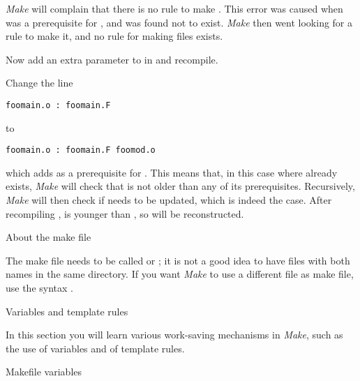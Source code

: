   {\emph{Make} will complain that there is no rule to make
    . This error was caused when  was a
    prerequisite for , and was found not to
    exist. \emph{Make} then went looking for a rule to make it, and no
    rule for making  files exists.}{}

Now add an extra
parameter to  in  and recompile. 


Change the line
\begin{verbatim}
foomain.o : foomain.F
\end{verbatim}
to
\begin{verbatim}
foomain.o : foomain.F foomod.o
\end{verbatim}
which adds  as a prerequisite for . This
means that, in this case where  already exists,
\emph{Make} will check that  is not older than any of its
prerequisites. Recursively, \emph{Make} will then check if
 needs to be updated, which is indeed the case.
After recompiling ,  is younger than
, so  will be reconstructed.


 {About the make file}

The make file needs to be called  or
; it is not a good idea to have files with both names in
the same directory.
If you want \emph{Make} to use a different file as make file, use the
syntax .

 {Variables and template rules}

\begin{purpose}
  In this section you will learn various work-saving mechanisms in
  \emph{Make}, such as the use of variables and of template rules.
\end{purpose}

 {Makefile variables}

